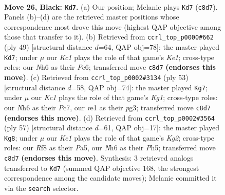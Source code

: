 \documentclass[11pt]{article}
\begin{document}
\clearpage

\begin{figure}[p]\centering
\begin{subfigure}{0.46\textwidth}\centering
\resizebox{\linewidth}{!}{%
\newchessgame
\chessboard[
  setfen={2k2r2/p1p1q1pp/1p2p2n/2p1Q3/5P2/2P3P1/1P5P/2K1R3 b - - 0 26},
  showmover=false,
  pgfstyle=straightmove, color=movearrow, markmove={c8-d7}
]}
\caption{}
\end{subfigure}\hfill
\begin{subfigure}{0.46\textwidth}\centering
\resizebox{\linewidth}{!}{%
\newchessgame
\chessboard[
  setfen={2q1kr2/1p3p1p/p1p1p3/4Qp2/8/6P1/PPP2P1P/2K1R3 b - - 3 25},
  showmover=false,
  pgfstyle=straightmove, color=movearrow, markmove={e8-d7}
]}
\caption{}
\end{subfigure}
\\[4pt]
\begin{subfigure}{0.46\textwidth}\centering
\resizebox{\linewidth}{!}{%
\newchessgame
\chessboard[
  setfen={4r1k1/2p2p2/1p3qp1/p2Pp3/2P1Q3/6P1/PP3PK1/3R4 b - - 3 27},
  showmover=false,
  pgfstyle=straightmove, color=movearrow, markmove={g8-g7}
]}
\caption{}
\end{subfigure}\hfill
\begin{subfigure}{0.46\textwidth}\centering
\resizebox{\linewidth}{!}{%
\newchessgame
\chessboard[
  setfen={4r3/2p3k1/1pqp2p1/p6p/2P4P/1PQR2P1/P4P2/6K1 b - - 2 29},
  showmover=false,
  pgfstyle=straightmove, color=movearrow, markmove={g7-g8}
]}
\caption{}
\end{subfigure}
\caption{\textbf{Move 26, Black: \texttt{Kd7}.} (a) Our position; Melanie plays \texttt{Kd7} (\texttt{c8d7}). Panels (b)--(d) are the retrieved master positions whose correspondence most drove this move (highest QAP objective among those that transfer to it). (b) Retrieved from \texttt{ccrl\_top\_p0000\#662} (ply 49) [structural distance $d$=64, QAP obj=78]: the master played \texttt{Kd7}; under $\mu$ our \emph{Kc1} plays the role of that game's \emph{Ke1}; cross-type roles: our \emph{N}h6 as their \emph{P}c6; transferred move \texttt{c8d7} \textbf{(endorses this move)}. (c) Retrieved from \texttt{ccrl\_top\_p0002\#3134} (ply 53) [structural distance $d$=58, QAP obj=74]: the master played \texttt{Kg7}; under $\mu$ our \emph{Kc1} plays the role of that game's \emph{Kg1}; cross-type roles: our \emph{N}h6 as their \emph{P}c7, our \emph{r}e1 as their \emph{p}g3; transferred move \texttt{c8d7} \textbf{(endorses this move)}. (d) Retrieved from \texttt{ccrl\_top\_p0002\#3564} (ply 57) [structural distance $d$=61, QAP obj=17]: the master played \texttt{Kg8}; under $\mu$ our \emph{Kc1} plays the role of that game's \emph{Kg2}; cross-type roles: our \emph{R}f8 as their \emph{P}a5, our \emph{N}h6 as their \emph{P}h5; transferred move \texttt{c8d7} \textbf{(endorses this move)}. Synthesis: 3 retrieved analogs transferred to \texttt{Kd7} (summed QAP objective 168, the strongest correspondence among the candidate moves); Melanie committed it via the \texttt{search} selector.}
\label{fig:thought-m51}
\end{figure}
\end{document}
